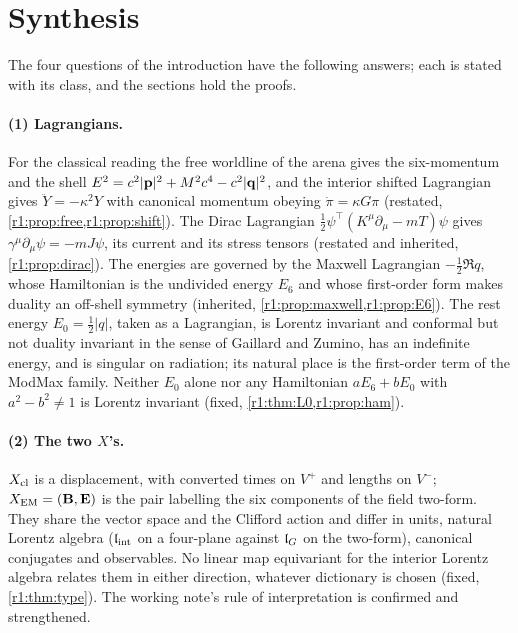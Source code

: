 \section{Synthesis}
\label{r5:sec:main}

The four questions of the introduction have the following answers; each is stated with its class, and the sections hold the proofs.

\paragraph{(1) Lagrangians.} For the classical reading the free worldline of the arena gives the six-momentum and the shell
$E^2=c^2|\mathbf p|^2+M^2c^4-c^2|\mathbf q|^2$, and the interior shifted Lagrangian gives $\ddot Y=-\kappa^2Y$ with canonical momentum obeying
$\dot\pi=\kappa G\pi$ (restated, \cref{r1:prop:free,r1:prop:shift}). The Dirac Lagrangian $\tfrac12\psi^{\!\top}(K^\mu\partial_\mu-mT)\psi$ gives
$\gamma^\mu\partial_\mu\psi=-mJ\psi$, its current and its stress tensors (restated and inherited, \cref{r1:prop:dirac}). The energies are
governed by the Maxwell Lagrangian $-\tfrac12\Re q$, whose Hamiltonian is the undivided energy $E_6$ and whose first-order form makes
duality an off-shell symmetry (inherited, \cref{r1:prop:maxwell,r1:prop:E6}). The rest energy $E_0=\tfrac12|q|$, taken as a Lagrangian, is
Lorentz invariant and conformal but not duality invariant in the sense of Gaillard and Zumino, has an indefinite energy, and is singular on
radiation; its natural place is the first-order term of the ModMax family. Neither $E_0$ alone nor any Hamiltonian $aE_6+bE_0$ with
$a^2-b^2\neq1$ is Lorentz invariant (fixed, \cref{r1:thm:L0,r1:prop:ham}).

\paragraph{(2) The two $X$'s.} $X_{\rm cl}$ is a displacement, with converted times on $V^+$ and lengths on $V^-$; $X_{\rm EM}=(\mathbf B,\mathbf E)$ is
the pair labelling the six components of the field two-form. They share the vector space and the Clifford action and differ in units,
natural Lorentz algebra ($\mathfrak l_{\rm int}$ on a four-plane against $\mathfrak l_G$ on the two-form), canonical conjugates and observables. No linear
map equivariant for the interior Lorentz algebra relates them in either direction, whatever dictionary is chosen (fixed,
\cref{r1:thm:type}). The working note's rule of interpretation is confirmed and strengthened.

